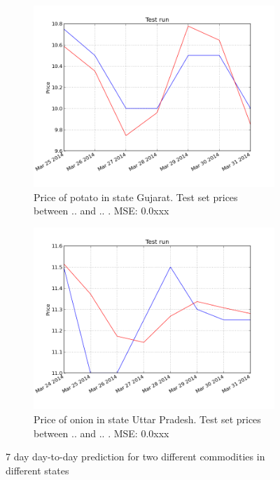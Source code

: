 \begin{figure}[!ht]
    \centering
        \begin{subfigure}[b]{.45\linewidth}
        \centering
        \includegraphics[width=\textwidth]{./img/plots/esn/daily/gujarat_potato_online_7d_1d.png}
        \caption{Price of potato in state Gujarat. Test set prices between .. and .. . MSE: 0.0xxx}
        \label{subfig:res_7d_1}
        \end{subfigure}
        \quad
        \begin{subfigure}[b]{.45\linewidth}
        \centering
        \includegraphics[width=\textwidth]{./img/plots/esn/daily/uttar_pradesh_redonion_7d_1d.png}
        \caption{Price of onion in state Uttar Pradesh. Test set prices between .. and .. . MSE: 0.0xxx}
        \label{subfig:res_7d_2}
        \end{subfigure}
    \caption{7 day day-to-day prediction for two different commodities in different states}   
    \label{fig:res_7d}
\end{figure}

